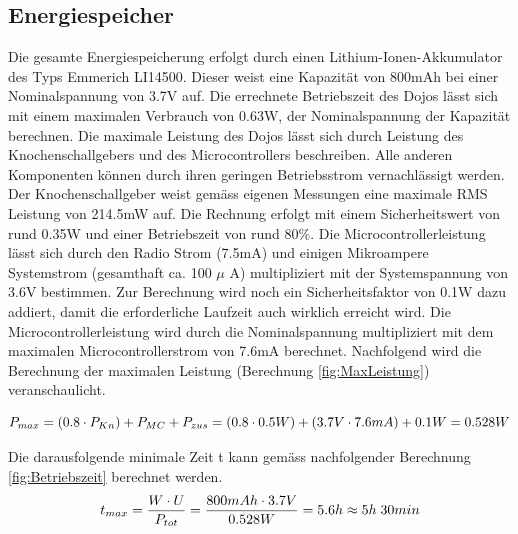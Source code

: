 \subsection{Energiespeicher}

Die gesamte Energiespeicherung erfolgt durch einen Lithium-Ionen-Akkumulator des Typs Emmerich LI14500. Dieser weist eine Kapazität von 800mAh bei einer Nominalspannung von 3.7V auf. Die errechnete Betriebszeit des Dojos lässt sich mit einem maximalen Verbrauch von 0.63W, der Nominalspannung der Kapazität berechnen. Die maximale Leistung des Dojos lässt sich durch Leistung des Knochenschallgebers und des Microcontrollers beschreiben. Alle anderen Komponenten können durch ihren geringen Betriebsstrom vernachlässigt werden. Der Knochenschallgeber weist gemäss eigenen Messungen eine maximale RMS Leistung von 214.5mW auf. Die Rechnung erfolgt mit einem Sicherheitswert von rund 0.35W und einer Betriebszeit von rund 80$\%$. Die Microcontrollerleistung lässt sich durch den Radio Strom (7.5mA) und einigen Mikroampere Systemstrom (gesamthaft ca. 100 $\mu$ A) multipliziert mit der Systemspannung von 3.6V bestimmen. Zur Berechnung wird noch ein Sicherheitsfaktor von 0.1W dazu addiert, damit die erforderliche Laufzeit auch wirklich erreicht wird. Die Microcontrollerleistung wird durch die Nominalspannung multipliziert mit dem maximalen Microcontrollerstrom von 7.6mA berechnet. Nachfolgend wird die Berechnung der maximalen Leistung (Berechnung \ref{fig:MaxLeistung}) veranschaulicht.

\begin{equation}
\centering
P_{max}=\left(0.8\cdot P_{Kn}\right)+P_{MC}+P_{zus}=(0.8\cdot 0.5W)+(3.7V \cdot 7.6mA)+0.1W=0.528W
\label{eq:MaxLeistung}
\end{equation}

Die darausfolgende minimale Zeit t kann gemäss nachfolgender Berechnung \ref{fig:Betriebszeit} berechnet werden.
\begin{equation}
t_{max}=\frac{W\cdot U}{P_{tot}}=\frac{800mAh \cdot 3.7V}{0.528W}=5.6h\approx 5h \thickspace 30min
\label{fig:Betriebszeit}
\end{equation}




